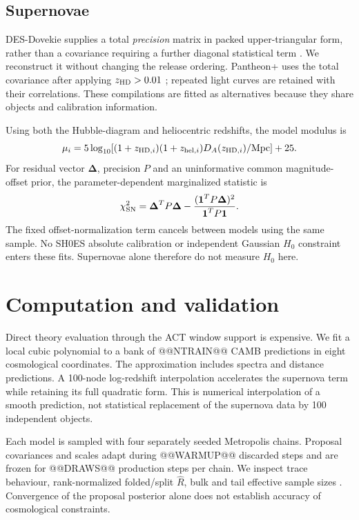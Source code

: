 \documentclass[fleqn,usenatbib]{mnras}
\begin{document}
\subsection{Supernovae}
DES-Dovekie supplies a total \emph{precision} matrix in packed upper-triangular
form, rather than a covariance requiring a further diagonal statistical term
\citep{Dovekie}. We reconstruct it without changing the release ordering.
Pantheon+ uses the total covariance after applying $z_{\rm HD}>0.01$
\citep{Pantheon,PantheonData}; repeated light curves are retained with their
correlations. These compilations are fitted as alternatives because they share
objects and calibration information.

Using both the Hubble-diagram and heliocentric redshifts, the model modulus is
\begin{equation}
 \mu_i=5\log_{10}\!\left[(1+z_{{\rm HD},i})(1+z_{{\rm hel},i})
 D_A(z_{{\rm HD},i})/{\rm Mpc}\right]+25.
\end{equation}
For residual vector $\boldsymbol\Delta$, precision $P$ and an uninformative
common magnitude-offset prior, the parameter-dependent marginalized statistic is
\begin{equation}
 \chi^2_{\rm SN}=\boldsymbol\Delta^TP\boldsymbol\Delta
 -\frac{(\boldsymbol 1^TP\boldsymbol\Delta)^2}{\boldsymbol 1^TP\boldsymbol 1}.
\end{equation}
The fixed offset-normalization term cancels between models using the same
sample. No SH0ES absolute calibration or independent Gaussian $H_0$ constraint
enters these fits. Supernovae alone therefore do not measure $H_0$ here.

\section{Computation and validation}\label{sec:computation}
Direct theory evaluation through the ACT window support is expensive. We fit a
local cubic polynomial to a bank of @@NTRAIN@@ CAMB predictions in eight
cosmological coordinates. The approximation includes spectra and distance
predictions. A 100-node log-redshift interpolation accelerates the supernova
term while retaining its full quadratic form. This is numerical interpolation
of a smooth prediction, not statistical replacement of the supernova data by
100 independent objects.

Each model is sampled with four separately seeded Metropolis chains. Proposal
covariances and scales adapt during @@WARMUP@@ discarded steps and are frozen
for @@DRAWS@@ production steps per chain. We inspect trace behaviour,
rank-normalized folded/split $\widehat R$, bulk and tail effective sample sizes
\citep{Rhat}. Convergence of the proposal posterior alone does not establish
accuracy of cosmological constraints.
\end{document}
